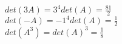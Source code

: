 \\
$det(3A) = 3^4det(A) = \frac{81}{2}$
\\
$det(-A) = -1^4det(A) = \frac{1}{2}$
\\
$det(A^3) = det(A)^3 = \frac{1}{8}$